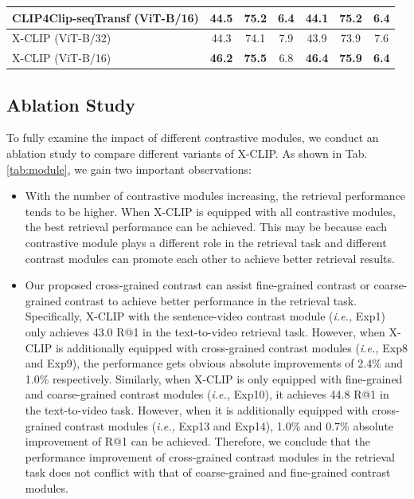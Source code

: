 \documentclass[sigconf]{acmart}
\begin{document}
\begin{table}[]
{\begin{tabular}{l|ccc|ccc}
CLIP4Clip-seqTransf (ViT-B/16) \cite{luo2021clip4clip} & 44.5   &  75.2    &  \textbf{6.4}   &   44.1   &  75.2    &   \textbf{6.4} \\ 
\hline
X-CLIP (ViT-B/32)    & 44.3 & 74.1 & 7.9 & 43.9 & 73.9 & 7.6 \\
X-CLIP (ViT-B/16)    & \textbf{46.2} & \textbf{75.5} & 6.8 & \textbf{46.4} & \textbf{75.9} & \textbf{6.4}     \\   \hline
\end{tabular}
}
\vspace{-0.2cm}
\label{tab:acnet_performance}
\end{table}



\subsection{Ablation Study}


To fully examine the impact of different contrastive modules, we conduct an ablation study to compare different variants of X-CLIP. As shown in Tab. \ref{tab:module}, we gain two important observations:
\begin{itemize}[leftmargin=*]
    \item With the number of contrastive modules increasing, the retrieval performance tends to be higher. When X-CLIP is equipped with all contrastive modules, the best retrieval performance can be achieved. This may be because each contrastive module plays a different role in the retrieval task and different contrast modules can promote each other to achieve better retrieval results.
    
    \item  Our proposed cross-grained contrast can assist fine-grained contrast or coarse-grained contrast to achieve better performance in the retrieval task. Specifically, X-CLIP with the sentence-video contrast module (\emph{i.e.,}  Exp1) only achieves 43.0 R@1 in the text-to-video retrieval task. However, when X-CLIP is additionally equipped with cross-grained contrast modules (\emph{i.e.,}  Exp8 and Exp9), the performance gets obvious absolute improvements of 2.4\% and 1.0\% respectively. Similarly, when X-CLIP is only equipped with fine-grained and coarse-grained contrast modules (\emph{i.e.,}  Exp10), it achieves 44.8 R@1 in the text-to-video task. However, when it is additionally equipped with cross-grained contrast modules (\emph{i.e.,}  Exp13 and Exp14), 1.0\% and 0.7\% absolute improvement of R@1 can be achieved. Therefore, we conclude that the performance improvement of cross-grained contrast modules in the retrieval task does not conflict with that of coarse-grained and fine-grained contrast modules.

\end{itemize}
\end{document}
